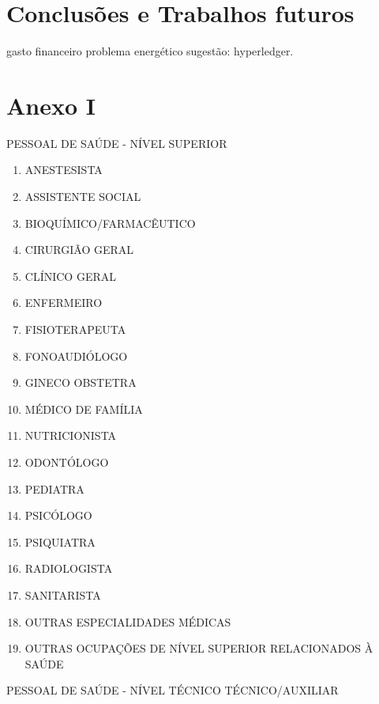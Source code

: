 \documentclass[a4paper,11pt]{article}
\begin{document}
\newpage
\section{Conclusões e Trabalhos futuros}

gasto financeiro
problema energético
sugestão: hyperledger.




\newpage
\section{Anexo I}

PESSOAL DE SAÚDE - NÍVEL SUPERIOR
\begin{enumerate}
    \item ANESTESISTA
    \item ASSISTENTE SOCIAL
    \item BIOQUÍMICO/FARMACÊUTICO
    \item CIRURGIÃO GERAL
    \item CLÍNICO GERAL
    \item ENFERMEIRO
    \item FISIOTERAPEUTA
    \item FONOAUDIÓLOGO
    \item GINECO OBSTETRA
    \item MÉDICO DE FAMÍLIA
    \item NUTRICIONISTA
    \item ODONTÓLOGO
    \item PEDIATRA
    \item PSICÓLOGO
    \item PSIQUIATRA
    \item RADIOLOGISTA
    \item SANITARISTA
    \item OUTRAS ESPECIALIDADES MÉDICAS
    \item OUTRAS OCUPAÇÕES DE NÍVEL SUPERIOR RELACIONADOS À SAÚDE
\end{enumerate}
PESSOAL DE SAÚDE - NÍVEL TÉCNICO TÉCNICO/AUXILIAR
\end{document}
